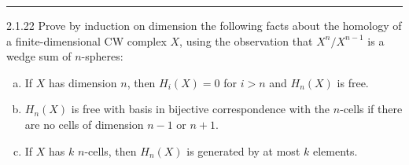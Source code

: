 \documentclass[a4paper, 12pt]{article}
\begin{document}
\noindent\rule{7in}{2.8pt}
\begin{problem}{2.1.22}
Prove by induction on dimension the following facts about the homology of a finite-dimensional CW complex \(X\), using the observation that \(X^n/X^{n-1}\) is a wedge sum of \(n\)-spheres:
\begin{enumerate}[(a)]
	\item If \(X\) has dimension \(n\), then \(H_i(X)=0\) for \(i>n\) and \(H_n(X)\) is free. 
	\item \(H_n(X)\) is free with basis in bijective correspondence with the \(n\)-cells if there are no cells of dimension \(n-1\) or \(n+1\).
	\item If \(X\) has \(k\) \(n\)-cells, then \(H_n(X)\) is generated by at most \(k\) elements.
\end{enumerate}
\end{problem}
\end{document}
